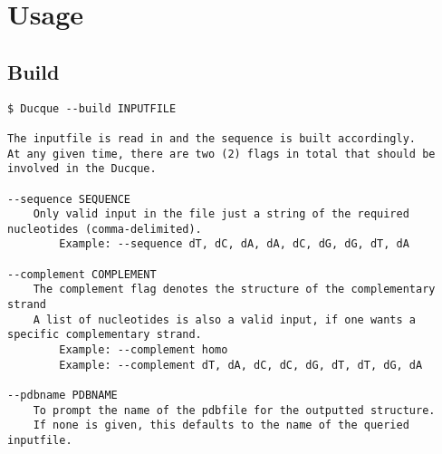 \pagebreak
\section{Usage}
\subsection{Build}

\small
\begin{verbatim}
$ Ducque --build INPUTFILE

The inputfile is read in and the sequence is built accordingly.
At any given time, there are two (2) flags in total that should be involved in the Ducque.

--sequence SEQUENCE
    Only valid input in the file just a string of the required nucleotides (comma-delimited).
        Example: --sequence dT, dC, dA, dA, dC, dG, dG, dT, dA

--complement COMPLEMENT
    The complement flag denotes the structure of the complementary strand
    A list of nucleotides is also a valid input, if one wants a specific complementary strand. 
        Example: --complement homo
        Example: --complement dT, dA, dC, dC, dG, dT, dT, dG, dA
    
--pdbname PDBNAME
    To prompt the name of the pdbfile for the outputted structure.
    If none is given, this defaults to the name of the queried inputfile.
\end{verbatim}
\normalsize
